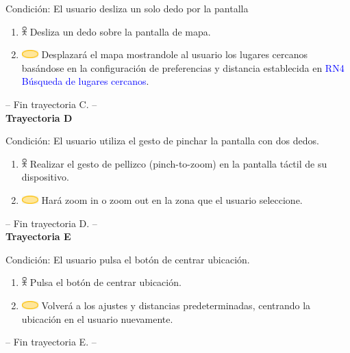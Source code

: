 Condición: El usuario desliza un solo dedo por la pantalla
\begin{enumerate}
    \item \includegraphics[width=0.0150\textwidth]{Figuras/persona.png} Desliza un dedo sobre la pantalla de mapa.
    \item \includegraphics[width=0.0500\textwidth]{Figuras/sistema.png} Desplazará el mapa mostrandole al usuario los lugares cercanos basándose en la configuración de preferencias y distancia establecida en {\textcolor{blue}{RN4 Búsqueda de lugares cercanos}}.
    \end{enumerate}
-- Fin trayectoria C. --\\


\textbf{Trayectoria D}

Condición: El usuario utiliza el gesto de pinchar la pantalla con dos dedos.
\begin{enumerate}
    \item \includegraphics[width=0.0150\textwidth]{Figuras/persona.png} Realizar el gesto de pellizco (pinch-to-zoom) en la pantalla táctil de su dispositivo.
    \item \includegraphics[width=0.0500\textwidth]{Figuras/sistema.png} Hará zoom in o zoom out en la zona que el usuario seleccione.
    \end{enumerate}
-- Fin trayectoria D. --\\


\textbf{Trayectoria E}

Condición: El usuario pulsa el botón de centrar ubicación.
\begin{enumerate}
    \item \includegraphics[width=0.0150\textwidth]{Figuras/persona.png} Pulsa el botón de centrar ubicación.
    \item \includegraphics[width=0.0500\textwidth]{Figuras/sistema.png} Volverá a los ajustes y distancias predeterminadas, centrando la ubicación en el usuario nuevamente.
    \end{enumerate}
-- Fin trayectoria E. --\\

